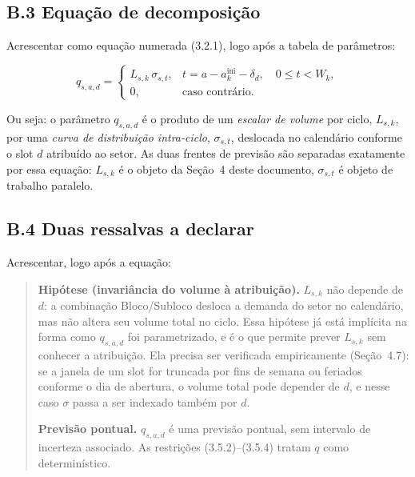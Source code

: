 \documentclass[11pt]{article}
\begin{document}
\subsection*{B.3 Equação de decomposição}

Acrescentar como equação numerada (3.2.1), logo após a tabela de
parâmetros:

\begin{equation}
q_{s,a,d} =
\begin{cases}
L_{s,k}\,\sigma_{s,t}, & t = a - a^{\mathrm{ini}}_k - \delta_d,
  \quad 0 \le t < W_k, \\[4pt]
0, & \text{caso contrário.}
\end{cases}
\end{equation}

\noindent Ou seja: o parâmetro $q_{s,a,d}$ é o produto de um \emph{escalar
de volume} por ciclo, $L_{s,k}$, por uma \emph{curva de distribuição
intra-ciclo}, $\sigma_{s,t}$, deslocada no calendário conforme o slot
$d$ atribuído ao setor. As duas frentes de previsão são separadas
exatamente por essa equação: $L_{s,k}$ é o objeto da Seção~4 deste
documento, $\sigma_{s,t}$ é objeto de trabalho paralelo.

\subsection*{B.4 Duas ressalvas a declarar}

Acrescentar, logo após a equação:

\begin{quote}
\textbf{Hipótese (invariância do volume à atribuição).} $L_{s,k}$ não
depende de $d$: a combinação Bloco/Subloco desloca a demanda do setor no
calendário, mas não altera seu volume total no ciclo. Essa hipótese já
está implícita na forma como $q_{s,a,d}$ foi parametrizado, e é o que
permite prever $L_{s,k}$ sem conhecer a atribuição. Ela precisa ser
verificada empiricamente (Seção~4.7): se a janela de um slot for truncada
por fins de semana ou feriados conforme o dia de abertura, o volume total
pode depender de $d$, e nesse caso $\sigma$ passa a ser indexado também
por $d$.

\textbf{Previsão pontual.} $q_{s,a,d}$ é uma previsão pontual, sem
intervalo de incerteza associado. As restrições (3.5.2)--(3.5.4) tratam
$q$ como determinístico.
\end{quote}

\end{document}
